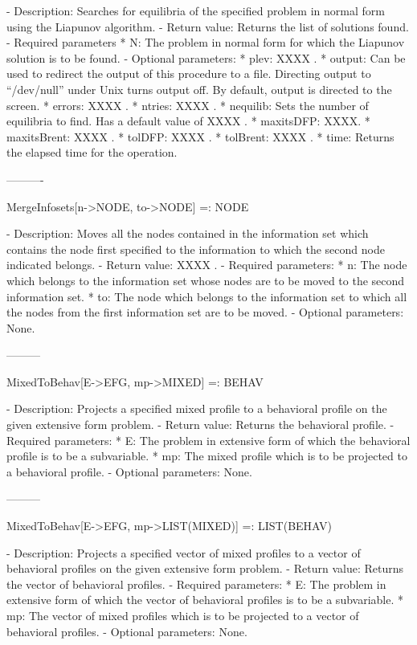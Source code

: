    -	Description:  Searches for equilibria of the specified problem in 
	normal form using the Liapunov algorithm.
   -	Return value:  Returns the list of solutions found.
   -	Required parameters
	  *  N:  The problem in normal form for which the Liapunov solution is 
		to be found.
   -	Optional parameters:
	  *  plev: XXXX .
	  *  output:  Can be used to redirect the output of this procedure to a
		file.  Directing output to ``/dev/null'' under Unix turns 
		output off.  By default, output is directed to the screen.
	  *  errors:  XXXX .
	  *  ntries:  XXXX .
	  *  nequilib:  Sets the number of equilibria to find.  Has a default 
		value of XXXX . 
	  *  maxitsDFP:  XXXX.
	  *  maxitsBrent:  XXXX .
	  *  tolDFP:  XXXX . 
	  *  tolBrent:  XXXX .
	  *  time:  Returns the elapsed time for the operation.

----------

MergeInfosets[n->NODE, to->NODE] =: NODE

   -	Description:  Moves all the nodes contained in the information set 
	which contains the node first specified to the information to which the
	second node indicated belongs.
   -	Return value:  XXXX .
   -	Required parameters:
	  *  n:  The node which belongs to the information set whose nodes are
		to be moved to the second information set.
	  *  to:  The node which belongs to the information set to which all
		the nodes from the first information set are to be moved.
   -	Optional parameters:  None.

---------

MixedToBehav[E->EFG, mp->MIXED] =: BEHAV

   -	Description:  Projects a specified mixed profile to a behavioral 
	profile on the given extensive form problem.
   -	Return value:  Returns the behavioral profile.
   -	Required parameters:
	  *  E:  The problem in extensive form of which the behavioral profile
		is to be a subvariable.
	  *  mp:  The mixed profile which is to be projected to a behavioral
		profile.
   -	Optional parameters:  None.

---------

MixedToBehav[E->EFG, mp->LIST(MIXED)] =: LIST(BEHAV)

   -	Description:  Projects a specified vector of mixed profiles to a vector
	of behavioral profiles on the given extensive form problem.
   -	Return value:  Returns the vector of behavioral profiles.
   -	Required parameters:
	  *  E:  The problem in extensive form of which the vector of 
		behavioral profiles is to be a subvariable.
	  *  mp:  The vector of mixed profiles which is to be projected to a 
		vector of behavioral profiles.
   -	Optional parameters:  None.

